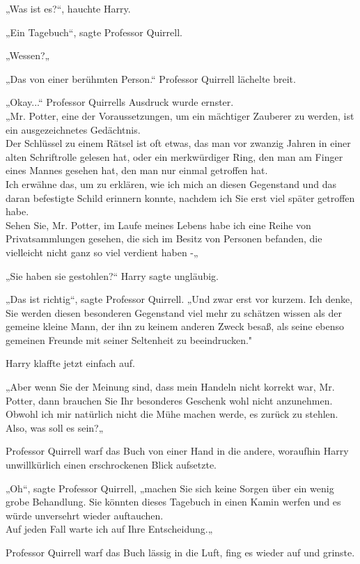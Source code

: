{„Was ist es?“, hauchte Harry.

„Ein Tagebuch“, sagte Professor Quirrell.

„Wessen?„

„Das von einer berühmten Person.“ Professor Quirrell lächelte breit.

„Okay...“ Professor Quirrells Ausdruck wurde ernster.\\ „Mr. Potter, eine der Voraussetzungen, um ein mächtiger Zauberer zu werden, ist ein ausgezeichnetes Gedächtnis.\\ Der Schlüssel zu einem Rätsel ist oft etwas, das man vor zwanzig Jahren in einer alten Schriftrolle gelesen hat, oder ein merkwürdiger Ring, den man am Finger eines Mannes gesehen hat, den man nur einmal getroffen hat.\\ Ich erwähne das, um zu erklären, wie ich mich an diesen Gegenstand und das daran befestigte Schild erinnern konnte, nachdem ich Sie erst viel später getroffen habe.\\ Sehen Sie, Mr. Potter, im Laufe meines Lebens habe ich eine Reihe von Privatsammlungen gesehen, die sich im Besitz von Personen befanden, die vielleicht nicht ganz so viel verdient haben -„

„Sie haben sie gestohlen?“ Harry sagte ungläubig.

„Das ist richtig“, sagte Professor Quirrell. „Und zwar erst vor kurzem. Ich denke, Sie werden diesen besonderen Gegenstand viel mehr zu schätzen wissen als der gemeine kleine Mann, der ihn zu keinem anderen Zweck besaß, als seine ebenso gemeinen Freunde mit seiner Seltenheit zu beeindrucken."

Harry klaffte jetzt einfach auf.

„Aber wenn Sie der Meinung sind, dass mein Handeln nicht korrekt war, Mr. Potter, dann brauchen Sie Ihr besonderes Geschenk wohl nicht anzunehmen. Obwohl ich mir natürlich nicht die Mühe machen werde, es zurück zu stehlen. Also, was soll es sein?„

Professor Quirrell warf das Buch von einer Hand in die andere, woraufhin Harry unwillkürlich einen erschrockenen Blick aufsetzte.

„Oh“, sagte Professor Quirrell, „machen Sie sich keine Sorgen über ein wenig grobe Behandlung. Sie könnten dieses Tagebuch in einen Kamin werfen und es würde unversehrt wieder auftauchen.\\ Auf jeden Fall warte ich auf Ihre Entscheidung.„

Professor Quirrell warf das Buch lässig in die Luft, fing es wieder auf und grinste.

}
